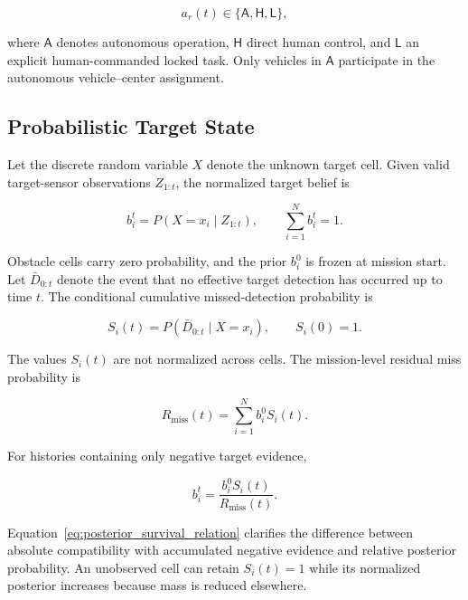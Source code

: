\documentclass[conference]{IEEEtran}
\begin{document}
\begin{equation}
a_r(t)\in\{\mathsf{A},\mathsf{H},\mathsf{L}\},
\label{eq:authority}
\end{equation}

where $\mathsf{A}$ denotes autonomous operation, $\mathsf{H}$ direct human
control, and $\mathsf{L}$ an explicit human-commanded locked task. Only
vehicles in $\mathsf{A}$ participate in the autonomous vehicle--center
assignment.

\subsection{Probabilistic Target State}

Let the discrete random variable $X$ denote the unknown target cell. Given
valid target-sensor observations $Z_{1:t}$, the normalized target belief is

\begin{equation}
b_i^t=P(X=x_i\mid Z_{1:t}),\qquad
\sum_{i=1}^{N}b_i^t=1.
\label{eq:posterior}
\end{equation}

Obstacle cells carry zero probability, and the prior $b_i^0$ is frozen at
mission start. Let $\bar D_{0:t}$ denote the event that no effective target
detection has occurred up to time $t$. The conditional cumulative
missed-detection probability is

\begin{equation}
S_i(t)=P(\bar D_{0:t}\mid X=x_i),\qquad S_i(0)=1.
\label{eq:cell_miss}
\end{equation}

The values $S_i(t)$ are not normalized across cells. The mission-level residual
miss probability is

\begin{equation}
R_{\mathrm{miss}}(t)=\sum_{i=1}^{N}b_i^0S_i(t).
\label{eq:rmiss}
\end{equation}

For histories containing only negative target evidence,

\begin{equation}
b_i^t=\frac{b_i^0S_i(t)}{R_{\mathrm{miss}}(t)}.
\label{eq:posterior_survival_relation}
\end{equation}

Equation~\eqref{eq:posterior_survival_relation} clarifies the difference
between absolute compatibility with accumulated negative evidence and relative
posterior probability. An unobserved cell can retain $S_i(t)=1$ while its
normalized posterior increases because mass is reduced elsewhere.
\end{document}
